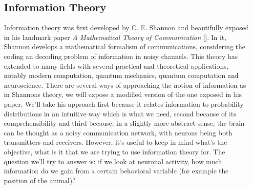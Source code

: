 \subsection{Information Theory}
\label{chap1:sec:3:subsec1:information_theory}
Information theory was first developed by C. E. Shannon and beautifully exposed in his landmark paper \textit{A Mathematical Theory of Communication} [\cite{shannon1948}].
In it, Shannon develops a mathematical formalism of communications, considering the coding an decoding problem of information in noisy channels.
This theory has extended to many fields with several practical and theoretical applications, notably modern computation, quantum mechanics, quantum computation and neuroscience.
There are several ways of approaching the notion of information as in Shannons theory, we will expose a modified version of the one exposed in his paper.
We'll take his approach first because it relates information to probability distributions in an intuitive way which is what we need, second because of its comprehensibility and third because, in a slightly more abstract sense, the brain can be thought as a noisy communication network, with neurons being both transmitters and receivers.
However, it's useful to keep in mind what's the objective, what is it that we are trying to use information theory for. 
The question we'll try to answer is: if we look at neuronal activity, how much information do we gain from a certain behavioral variable (for example the position of the animal)? 

